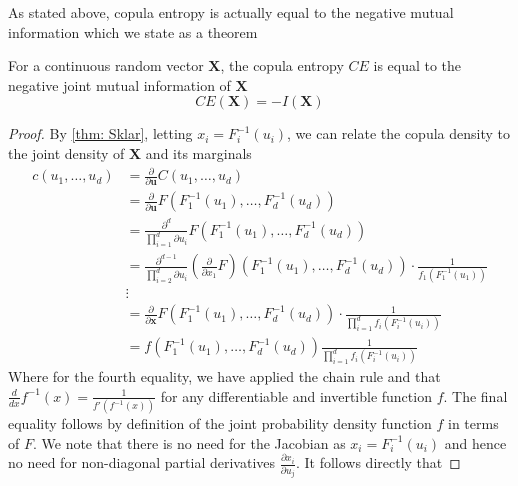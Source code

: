 \documentclass[../Thesis.tex]{subfiles}
\begin{document}
As stated above, copula entropy is actually equal to the negative mutual information which we state as a theorem
\begin{theorem}\label{thm:copula entropy equals mutual information}
    For a continuous random vector $\boldsymbol{X}$, the copula entropy $CE$ is equal to the negative joint mutual information of $\boldsymbol{X}$
    $$CE\left(\boldsymbol{X}\right) = - I\left(\boldsymbol{X}\right)$$
\end{theorem}
\begin{proof}
    By \autoref{thm: Sklar}, letting $x_i = F_i^{-1}\left(u_i\right)$, we can relate the copula density to the joint density of $\boldsymbol{X}$ and its marginals
    \begin{align*}
        c(u_1,\dots , u_d) & = \frac{\partial}{\partial \mathbf{u}} C(u_1,\dots,u_d)                                                                                                                   \\
                           & = \frac{\partial}{\partial \mathbf{u}} F\left(F_1^{-1}\left(u_1\right), \dots, F_d^{-1}\left(u_d\right)\right)                                                            \\
                           & = \frac{\partial^d}{\prod_{i = 1}^{d} \partial u_i}  F\left(F_1^{-1}\left(u_1\right), \dots, F_d^{-1}\left(u_d\right)\right)\\
                           & = \frac{\partial^{d-1}}{\prod_{i = 2}^{d} \partial u_i}  \left(\frac{\partial}{\partial x_1}F\right)\left(F_1^{-1}\left(u_1\right), \dots, F_d^{-1}\left(u_d\right)\right) \cdot \frac{1}{f_1\left(F^{-1}_1\left(u_1\right)\right)}\\
                           & \vdots \\
                           & = \frac{\partial}{\partial \boldsymbol x} F\left(F_1^{-1}\left(u_1\right),\dots, F_d^{-1}\left(u_d\right)\right) \cdot \frac{1}{\prod_{i = 1}^{d} f_i \left(F_i^{-1}\left(u_i\right)\right) } \\
                           & = f\left(F_1^{-1}\left(u_1\right),\dots, F_d^{-1}\left(u_d\right)\right) \frac{1}{ \prod_{i = 1}^d f_i\left(F_i^{-1}\left(u_i\right)\right)}
    \end{align*}
    Where for the fourth equality, we have applied the chain rule and that $\frac{d}{dx} f^{-1}\left(x\right) = \frac{1}{f' \left(f^{-1}\left(x\right)\right)}$ for any differentiable and invertible function $f$. The final equality follows by definition of the joint probability density function $f$ in terms of $F$. We note that there is no need for the Jacobian as $x_i = F_i^{-1}\left(u_i\right)$ and hence no need for non-diagonal partial derivatives $\frac{\partial x_i}{\partial u_j}$. It follows directly that

\end{proof}
\end{document}

